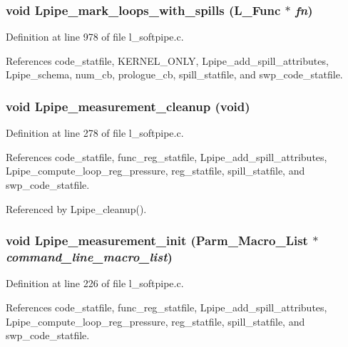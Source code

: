 \subsubsection{\setlength{\rightskip}{0pt plus 5cm}void Lpipe\_\-mark\_\-loops\_\-with\_\-spills (L\_\-Func $\ast$ {\em fn})}\label{l__softpipe_8c_1240d252386c4bb4d5f9bc08a7c2039e}




Definition at line 978 of file l\_\-softpipe.c.

References code\_\-statfile, KERNEL\_\-ONLY, Lpipe\_\-add\_\-spill\_\-attributes, Lpipe\_\-schema, num\_\-cb, prologue\_\-cb, spill\_\-statfile, and swp\_\-code\_\-statfile.
\subsubsection{\setlength{\rightskip}{0pt plus 5cm}void Lpipe\_\-measurement\_\-cleanup (void)}\label{l__softpipe_8c_c18c12740729ece750284668380d64dd}




Definition at line 278 of file l\_\-softpipe.c.

References code\_\-statfile, func\_\-reg\_\-statfile, Lpipe\_\-add\_\-spill\_\-attributes, Lpipe\_\-compute\_\-loop\_\-reg\_\-pressure, reg\_\-statfile, spill\_\-statfile, and swp\_\-code\_\-statfile.

Referenced by Lpipe\_\-cleanup().
\subsubsection{\setlength{\rightskip}{0pt plus 5cm}void Lpipe\_\-measurement\_\-init (Parm\_\-Macro\_\-List $\ast$ {\em command\_\-line\_\-macro\_\-list})}\label{l__softpipe_8c_4f72a55b73cc8bb4b70700d7ba9cffe2}




Definition at line 226 of file l\_\-softpipe.c.

References code\_\-statfile, func\_\-reg\_\-statfile, Lpipe\_\-add\_\-spill\_\-attributes, Lpipe\_\-compute\_\-loop\_\-reg\_\-pressure, reg\_\-statfile, spill\_\-statfile, and swp\_\-code\_\-statfile.

